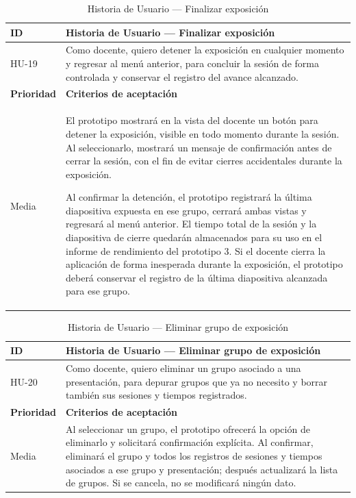 \documentclass[11pt]{article}
\newcommand{\ttstyle}{%
  \small
  \setlength{\tabcolsep}{6pt}%
  \renewcommand{\arraystretch}{1.25}%
  \arrayrulecolor{azulprofundo}%
}
\newcommand{\hairrule}{%
  \arrayrulecolor{azulregla}\midrule[0.3pt]\arrayrulecolor{azulprofundo}%
}
\begin{document}
\begin{table}[H]
    \centering
    \renewcommand{\arraystretch}{1.2}
    \ttstyle
    \begin{tabular}{p{2.5cm}p{11cm}}
        \toprule
        \textbf{ID} & \textbf{Historia de Usuario --- Finalizar exposición} \\
        \midrule
        HU-19 & Como docente, quiero detener la exposición en cualquier momento y regresar al menú anterior, para concluir la sesión de forma controlada y conservar el registro del avance alcanzado. \\
        \hairrule
        \textbf{Prioridad} & \textbf{Criterios de aceptación} \\
        \hairrule
        Media & El prototipo mostrará en la vista del docente un botón para detener la exposición, visible en todo momento durante la sesión. Al seleccionarlo, mostrará un mensaje de confirmación antes de cerrar la sesión, con el fin de evitar cierres accidentales durante la exposición.

        Al confirmar la detención, el prototipo registrará la última diapositiva expuesta en ese grupo, cerrará ambas vistas y regresará al menú anterior. El tiempo total de la sesión y la diapositiva de cierre quedarán almacenados para su uso en el informe de rendimiento del prototipo 3. Si el docente cierra la aplicación de forma inesperada durante la exposición, el prototipo deberá conservar el registro de la última diapositiva alcanzada para ese grupo. \\
        \bottomrule
    \end{tabular}
    \caption{Historia de Usuario --- Finalizar exposición}
    \label{tab:hu-finalizar-exposicion}
\end{table}

\begin{table}[H]
    \centering
    \renewcommand{\arraystretch}{1.2}
    \ttstyle
    \begin{tabular}{p{2.5cm}p{11cm}}
        \toprule
        \textbf{ID} & \textbf{Historia de Usuario --- Eliminar grupo de exposición} \\
        \midrule
        HU-20 & Como docente, quiero eliminar un grupo asociado a una presentación, para depurar grupos que ya no necesito y borrar también sus sesiones y tiempos registrados. \\
        \hairrule
        \textbf{Prioridad} & \textbf{Criterios de aceptación} \\
        \hairrule
        Media & Al seleccionar un grupo, el prototipo ofrecerá la opción de eliminarlo y solicitará confirmación explícita. Al confirmar, eliminará el grupo y todos los registros de sesiones y tiempos asociados a ese grupo y presentación; después actualizará la lista de grupos. Si se cancela, no se modificará ningún dato. \\
        \bottomrule
    \end{tabular}
    \caption{Historia de Usuario --- Eliminar grupo de exposición}
    \label{tab:hu-eliminar-grupo-exposicion}
\end{table}
\end{document}
